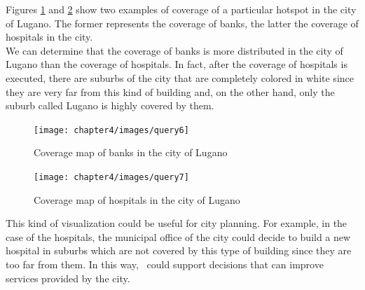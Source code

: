 Figures \ref{fig:query6} and \ref{fig:query7} show two examples of coverage of a particular hotspot in the city of Lugano. The former represents the coverage of banks, the latter the coverage of hospitals in the city.\\We can determine that the coverage of banks is more distributed in the city of Lugano than the coverage of hospitals. In fact, after the coverage of hospitals is executed, there are suburbs of the city that are completely colored in white since they are very far from this kind of building and, on the other hand, only the suburb called Lugano is highly covered by them.
\begin{figure} [H]
\centering
\texttt{[image: chapter4/images/query6]}
\caption{Coverage map of banks in the city of Lugano}
\label{fig:query6}
\end{figure} 
\begin{figure} [H]
\centering
\texttt{[image: chapter4/images/query7]}
\caption{Coverage map of hospitals in the city of Lugano}
\label{fig:query7}
\end{figure} 
This kind of visualization could be useful for city planning. For example, in the case of the hospitals, the municipal office of the city could decide to build a new hospital in suburbs which are not covered by this type of building since they are too far from them. In this way, \applicationName\ could support decisions that can improve services provided by the city.
